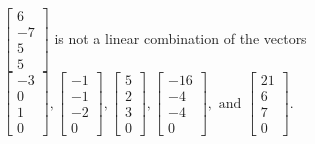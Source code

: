 \begin{exercise}
\begin{exerciseStatement}
  \end{exerciseStatement}
  \begin{exerciseAnswer}
   \(\left[\begin{array}{c}
6 \\
-7 \\
5 \\
5
\end{array}\right]\) 
  	 is not  
	a linear combination of the vectors \(\left[\begin{array}{c}
-3 \\
0 \\
1 \\
0
\end{array}\right] , \left[\begin{array}{c}
-1 \\
-1 \\
-2 \\
0
\end{array}\right] , \left[\begin{array}{c}
5 \\
2 \\
3 \\
0
\end{array}\right] , \left[\begin{array}{c}
-16 \\
-4 \\
-4 \\
0
\end{array}\right] , \text{ and } \left[\begin{array}{c}
21 \\
6 \\
7 \\
0
\end{array}\right]\).

	
  


  \end{exerciseAnswer}
\end{exercise}